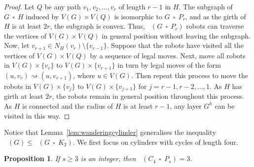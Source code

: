 \documentclass[a4paper,12pt]{article}
\DeclareMathOperator{\mob}{Mob_{gp}}
\DeclareMathOperator{\cp}{\,\square\,}
\newtheorem{proposition}[theorem]{Proposition}
\theoremstyle{definition}
\newcommand{\move}{\rightsquigarrow}
\begin{document}
	\begin{proof}
		Let $Q$ be any path $v_1,v_2,\dots ,v_r$ of length $r-1$ in $H$. The subgraph of $G \cp H$ induced by $V(G) \times V(Q) $ is isomorphic to $G \cp P_r$, and as the girth of $H$ is at least $2r$, the subgraph is convex. Thus, $\mob (G \cp P_r)$ robots can traverse the vertices of $V(G) \times V(Q) $ in general position without leaving the subgraph. Now, let $v_{r+1} \in N_H(v_r) \setminus \{ v_{r-1}\} $. Suppose that the robots have visited  all the vertices of $V(G) \times V(Q)$ by a sequence of legal moves. Next, move all robots in $V(G) \times \{ v_r\} $ to $V(G) \times \{ v_{r+1}\} $ in turn by legal moves of the form $(u,v_r) \move (u,v_{r+1})$, where $u \in V(G)$. Then repeat this process to move the robots in $V(G) \times \{ v_j\} $ to $V(G) \times \{ v_{j+1}\} $ for $j = r-1,r-2,\dots ,1$. As $H$ has girth at least $2r$, the robots remain in general position throughout this process. As $H$ is connected and the radius of $H$ is at least $r-1$, any layer $G^h$ can be visited in this way. 
	\end{proof}
	
	Notice that Lemma~\ref{lem:wanderingcylinder} generalises the inequality $\mob (G) \leq \mob (G \cp K_2)$. We first focus on cylinders with cycles of length four.
	
	\begin{proposition}
		If $s \geq 3$ is an integer, then $\mob (C_4 \cp P_s) = 3$.
	\end{proposition}
	
\end{document}

